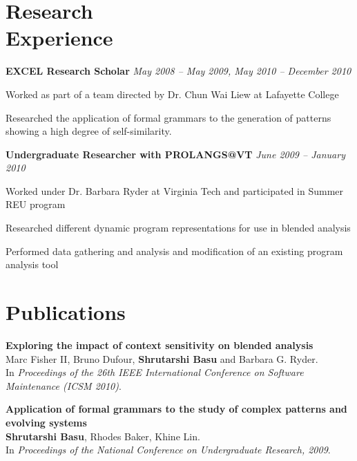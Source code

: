 \documentclass[margin,line]{resume}
\begin{document}
\begin{resume}
    \section{\mysidestyle Research\\Experience} 
    {\bf EXCEL Research Scholar} \hfill   {\sl May 2008 -- May 2009, May 2010 -- December 2010} \\
    \begin{list2}
    	\item Worked as part of a team directed by Dr. Chun Wai Liew at Lafayette College
    	\item Researched the application of formal grammars to the generation of patterns showing a high degree of self-similarity.
    \end{list2}

    {\bf Undergraduate Researcher with PROLANGS@VT } \hfill   {\sl June 2009 -- January 2010} \\
    \begin{list2}
    	\item Worked under Dr. Barbara Ryder at Virginia Tech and participated in Summer REU program
	\item Researched different dynamic program representations for use in blended analysis
	\item Performed data gathering and analysis and modification of an existing program analysis tool
    \end{list2}

    \section{\mysidestyle Publications}
    {\bf Exploring the impact of context sensitivity on blended analysis} \\
    Marc Fisher II, Bruno Dufour, {\bf Shrutarshi Basu} and Barbara G. Ryder.\\
    In \emph{Proceedings of the 26th IEEE International Conference on Software Maintenance (ICSM 2010)}.
    
    {\bf Application of formal grammars to the study of complex patterns and evolving systems}\\
    {\bf Shrutarshi Basu}, Rhodes Baker, Khine Lin. \\
    In \emph{Proceedings of the National Conference on Undergraduate Research, 2009}.



\end{resume}
\end{document}
